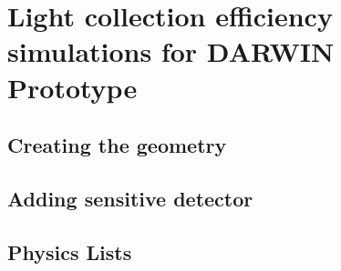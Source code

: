 \documentclass[10pt,a4paper]{book}
\begin{document}
\section{Light collection efficiency simulations for DARWIN Prototype}


\subsection{Creating the geometry}
\subsection{Adding sensitive detector}
\subsection{Physics Lists}
\end{document}

